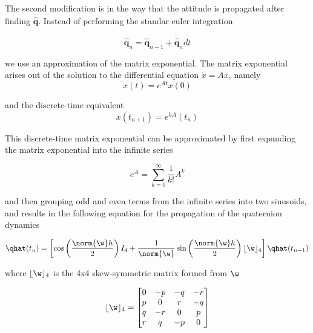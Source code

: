 \documentclass[paper=a4, fontsize=11pt]{scrartcl} %
\numberwithin{equation}{section} %
\numberwithin{figure}{section} %
\numberwithin{table}{section} %
\begin{document}
The second modification is in the way that the attitude is propagated after finding $\bm{\dot{\hat{q}}}$.  Instead of performing the standar euler integration

\begin{equation}
	\bm{\hat{q}}_n = \bm{\hat{q}}_{n-1}+\bm{\dot{\hat{q}}}_{n}dt
\end{equation}

we use an approximation of the matrix exponential.  The matrix exponential arises out of the solution to the differential equation $\dot{x} = Ax$, namely
\begin{equation}
	x(t) = e^{At} x(0)
\end{equation}

and the discrete-time equivalent
\begin{equation}
	x(t_{n+1}) = e^{hA}(t_n)
\end{equation}

This discrete-time matrix exponential can be approximated by first expanding the matrix exponential into the infinite series

\begin{equation}
	e^{A} = \sum_{k=0}^\infty \dfrac{1}{k!}A^k
\end{equation}


and then grouping odd and even terms from the infinite series into two sinusoids, and results in the following equation for the propagation of the quaternion dynamics~\


\begin{equation}
	\qhat(t_n) = \left[ \cos \left( \frac{\norm{\w}h}{2}\right)I_4  + \frac{1}{\norm{\w}} \sin \left( \frac{\norm{\w}h}{2} \right) \lfloor\w\rfloor_4   \right] \qhat(t_{n-1})
	\label{eq:mat_exponential}
\end{equation}

where $\lfloor\w\rfloor_4$ is the 4x4 skew-symmetric matrix formed from $\w$

\begin{equation}
	\lfloor\w\rfloor_4 =
	\begin{bmatrix}
	    0	& - p & - q  & - r  \\
      	p   &   0   &  r & - q \\
      	q   & - r  &  0   &  p \\
      	r   &  q  & - p & 0  \\
	\end{bmatrix}
\end{equation}
\end{document}
